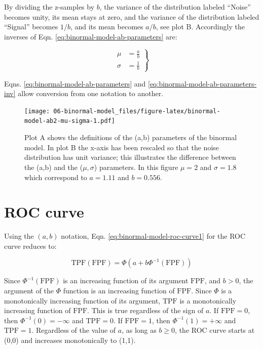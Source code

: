 \documentclass[
]{book}
\begin{document}
By dividing the z-samples by \(b\), the variance of the distribution labeled ``Noise'' becomes unity, its mean stays at zero, and the variance of the distribution labeled ``Signal'' becomes \(1/b\), and its mean becomes \(a/b\), see plot B. Accordingly the inverses of Eqn. \eqref{eq:binormal-model-ab-parameters} are:

\begin{equation} 
\left. 
\begin{aligned}
\mu&=\frac{a}{b}\\
\sigma&=\frac{1}{b}
\end{aligned}
\right \}
\label{eq:binormal-model-ab-parameters-inv}
\end{equation}

Eqns. \eqref{eq:binormal-model-ab-parameters} and \eqref{eq:binormal-model-ab-parameters-inv} allow conversion from one notation to another.

\begin{figure}
\centering
\texttt{[image: 06-binormal-model\_files/figure-latex/binormal-model-ab2-mu-sigma-1.pdf]}
\caption{\label{fig:binormal-model-ab2-mu-sigma}Plot A shows the definitions of the (a,b) parameters of the binormal model. In plot B the x-axis has been rescaled so that the noise distribution has unit variance; this illustrates the difference between the (a,b) and the (\(\mu,\sigma\)) parameters. In this figure \(\mu = 2\) and \(\sigma = 1.8\) which correspond to \(a = 1.11\) and \(b = 0.556\).}
\end{figure}

\hypertarget{binormal-model-roc-curve}{%
\section{ROC curve}\label{binormal-model-roc-curve}}

Using the \((a,b)\) notation, Eqn. \eqref{eq:binormal-model-roc-curve1} for the ROC curve reduces to:

\begin{equation} 
\text{TPF}\left ( \text{FPF} \right ) = \Phi\left ( a+ b \Phi^{-1}\left (\text{FPF}  \right ) \right )
\label{eq:binormal-model-roc-curve-tpf-fpf}
\end{equation}

Since \(\Phi^{-1}(\text{FPF})\) is an increasing function of its argument \(\text{FPF}\), and \(b > 0\), the argument of the \(\Phi\) function is an increasing function of \(\text{FPF}\). Since \(\Phi\) is a monotonically increasing function of its argument, \(\text{TPF}\) is a monotonically increasing function of \(\text{FPF}\). This is true regardless of the sign of \(a\). If \(\text{FPF} = 0\), then \(\Phi^{-1}(0) = -\infty\) and \(\text{TPF} = 0\). If \(\text{FPF} = 1\), then \(\Phi^{-1}(1) = +\infty\) and \(\text{TPF} = 1\). Regardless of the value of \(a\), as long as \(b \ge 0\), the ROC curve starts at (0,0) and increases monotonically to (1,1).
\end{document}
